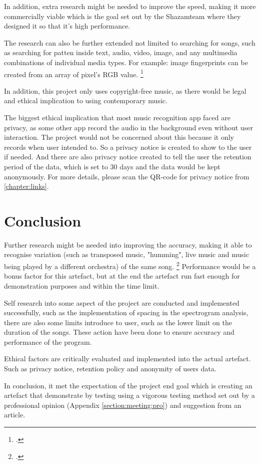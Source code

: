 In addition, extra research might be needed to improve the speed, making it more commercially viable which is the goal set out by the Shazam\trademark team where they designed it so that it's high performance.

The research can also be further extended not limited to searching for songs, such as searching for patten inside text, audio, video, image, and any multimedia combinations of individual media types. For example: image fingerprints can be created from an array of pixel's RGB value. \footcite{wang_systems_2013}

In addition, this project only uses copyright-free music, as there would be legal and ethical implication to using contemporary music.

The biggest ethical implication that most music recognition app faced are privacy, as some other app record the audio in the background even without user interaction. The project would not be concerned about this because it only records when user intended to. So a privacy notice is created to show to the user if needed. And there are also privacy notice created to tell the user the retention period of the data, which is set to 30 days and the data would be kept anonymously. For more details, please scan the QR-code for privacy notice from \autoref{chapter:links}.

\chapter{Conclusion}

Further research might be needed into improving the accuracy, making it able to recognise variation (such as transposed music, "humming", live music and music being played by a different orchestra) of the same song. \footcite{yang_music_2001} Performance would be a bonus factor for this artefact, but at the end the artefact run fast enough for demonstration purposes and within the time limit.

Self research into some aspect of the project are conducted and implemented successfully, such as the implementation of spacing in the spectrogram analysis, there are also some limits introduce to user, such as the lower limit on the duration of the songs. These action have been done to ensure accuracy and performance of the program.

Ethical factors are critically evaluated and implemented into the actual artefact. Such as privacy notice, retention policy and anonymity of users data.

In conclusion, it met the expectation of the project end goal which is creating an artefact that demonstrate by testing using a vigorous testing method set out by a professional opinion (Appendix \autoref{section:meeting:pro}) and suggestion from an article. 
